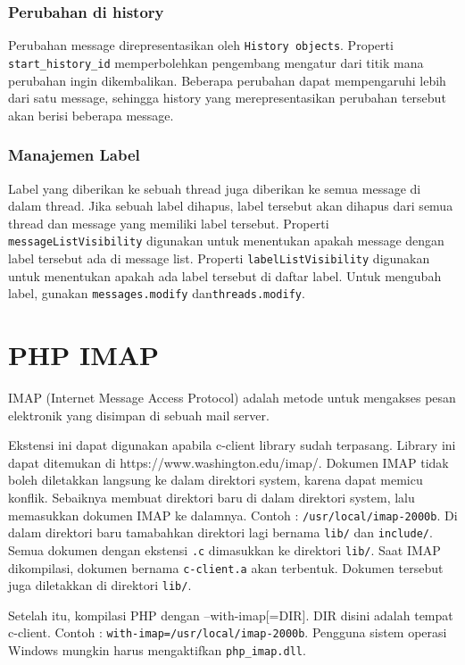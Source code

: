 \subsubsection{Perubahan di history}
Perubahan message direpresentasikan oleh \texttt{History objects}. Properti \texttt{start\_history\_id} memperbolehkan pengembang mengatur dari titik mana perubahan ingin dikembalikan. Beberapa perubahan dapat mempengaruhi lebih dari satu message, sehingga history yang merepresentasikan perubahan tersebut akan berisi beberapa message.

\subsubsection{Manajemen Label}
Label yang diberikan ke sebuah thread juga diberikan ke semua message di dalam thread. Jika sebuah label dihapus, label tersebut akan dihapus dari semua thread dan message yang memiliki label tersebut. Properti \texttt{messageListVisibility} digunakan untuk menentukan apakah message dengan label tersebut ada di message list. Properti \texttt{labelListVisibility} digunakan untuk menentukan apakah ada label tersebut di daftar label. Untuk mengubah label, gunakan \texttt{messages.modify} dan\texttt{threads.modify}.

\section{PHP IMAP ~\cite{php-imap}}
\label{sec:PHPIMAP}
IMAP (Internet Message Access Protocol) adalah metode untuk mengakses pesan elektronik yang disimpan di sebuah mail server.

Ekstensi ini dapat digunakan apabila c-client library sudah terpasang. Library ini dapat ditemukan di https://www.washington.edu/imap/. Dokumen IMAP tidak boleh diletakkan langsung ke dalam direktori system, karena dapat memicu konflik. Sebaiknya membuat direktori baru di dalam direktori system, lalu memasukkan dokumen IMAP ke dalamnya. Contoh : \texttt{/usr/local/imap-2000b}. Di dalam direktori baru tamabahkan direktori lagi bernama \texttt{lib/} dan \texttt{include/}. Semua dokumen dengan ekstensi \texttt{.c} dimasukkan ke direktori \texttt{lib/}. Saat IMAP dikompilasi, dokumen bernama \texttt{c-client.a} akan terbentuk. Dokumen tersebut juga diletakkan di direktori \texttt{lib/}.

Setelah itu, kompilasi PHP dengan --with-imap[=DIR]. DIR disini adalah tempat c-client. Contoh : \texttt{with-imap=/usr/local/imap-2000b}. Pengguna sistem operasi Windows mungkin harus mengaktifkan \texttt{php\_imap.dll}.

